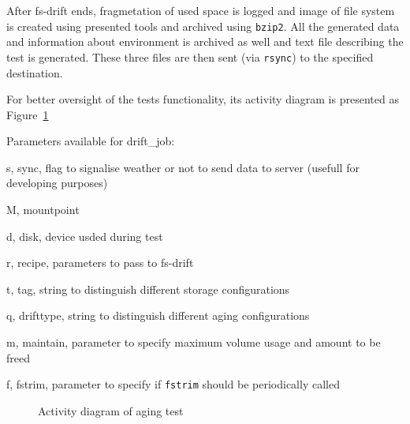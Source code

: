 \documentclass[
  color, %
  table, %
  lof,   %
  lot,   %
]{fithesis3}
\begin{document}
After fs-drift ends, fragmetation of used space is logged and image of file system is created using presented tools and archived using \texttt{bzip2}. All the generated data and information about environment is archived as well and text file describing the test is generated. These three files are then sent (via \texttt{rsync}) to the specified destination.

For better oversight of the tests functionality, its activity diagram is presented as Figure~\ref{fig:drift_job_activity}

Parameters available for drift\_job:
\begin{compactenum}
  \item s, sync, flag to signalise weather or not to send data to server (usefull for developing purposes)
  \item M, mountpoint
  \item d, disk, device usded during test
  \item r, recipe, parameters to pass to fs-drift
  \item t, tag, string to distinguish different storage configurations
  \item q, drifttype, string to distinguish different aging configurations
  \item m, maintain, parameter to specify maximum volume usage and amount to be freed
  \item f, fstrim, parameter to specify if \texttt{fstrim} should be periodically called
  \end{compactenum}


\begin{figure}[ht]
    \centering
    \caption{Activity diagram of aging test}
    \label{fig:drift_job_activity}
\end{figure}
\end{document}
